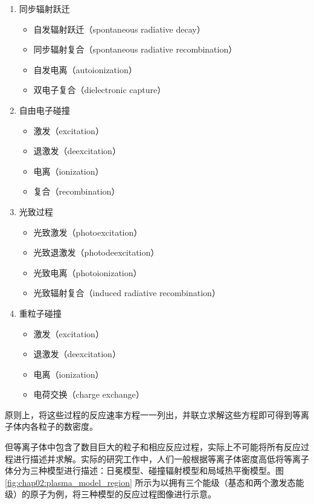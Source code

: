 \begin{enumerate}
  \item 同步辐射跃迁
    \begin{itemize}
      \item 自发辐射跃迁（spontaneous radiative decay）
      \item 同步辐射复合（spontaneous radiative recombination）
      \item 自发电离（autoionization）
      \item 双电子复合（dielectronic capture）
    \end{itemize}
  \item 自由电子碰撞
    \begin{itemize}
      \item 激发（excitation）
      \item 退激发（deexcitation）
      \item 电离（ionization）
      \item 复合（recombination）
    \end{itemize}
  \item 光致过程
    \begin{itemize}
      \item 光致激发（photoexcitation）
      \item 光致退激发（photodeexcitation）
      \item 光致电离（photoionization）
      \item 光致辐射复合（induced radiative recombination）
    \end{itemize}
  \item 重粒子碰撞
    \begin{itemize}
      \item 激发（excitation）
      \item 退激发（deexcitation）
      \item 电离（ionization）
      \item 电荷交换（charge exchange）
    \end{itemize}
\end{enumerate}

原则上，将这些过程的反应速率方程一一列出，并联立求解这些方程即可得到等离子体内各粒子的数密度。


但等离子体中包含了数目巨大的粒子和相应反应过程，实际上不可能将所有反应过程进行描述并求解。实际的研究工作中，人们一般根据等离子体密度高低将等离子体分为三种模型进行描述：日冕模型、碰撞辐射模型和局域热平衡模型。图 \ref{fig:chap02:plasma_model_region} 所示为以拥有三个能级（基态和两个激发态能级）的原子为例，将三种模型的反应过程图像进行示意。

